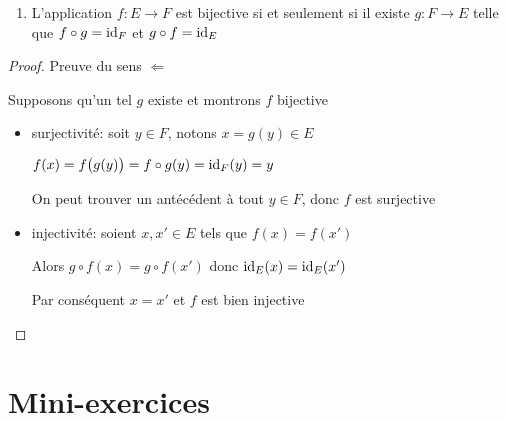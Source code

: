 \begin{frame}
\begin{proposition}
\begin{enumerate}
  \item L'application $f : E \to F$ est bijective si et seulement si il existe $g : F \to E$
telle que $f \circ g = \mathop{\text{id}}\nolimits_F$ et $g \circ f = \mathop{\text{id}}\nolimits_E$
\end{enumerate}
\end{proposition}

\medskip


\begin{proof}
Preuve du sens $\Leftarrow$ 

\pause
\medskip

Supposons qu'un tel $g$ existe et montrons $f$ bijective

\pause

\begin{itemize}
  \item surjectivité: soit $y \in F$, notons $x = g(y) \in E$

\pause

$f(x) = f\big( g(y) \big) = f \circ g(y) = \mathop{\text{id}}\nolimits_F(y)=y$

\pause

On peut trouver un antécédent à tout $y\in F$, donc $f$ est surjective

\pause

  \item injectivité: soient $x,x' \in E$ tels que $f(x)=f(x')$

\pause

Alors $g\circ f(x)=g\circ f(x')$ donc $\mathop{\text{id}}\nolimits_E(x)=\mathop{\text{id}}\nolimits_E(x')$


\pause
Par conséquent $x=x'$ et $f$ est bien injective
    \end{itemize}
\end{proof}
\end{frame}




\section{Mini-exercices}



